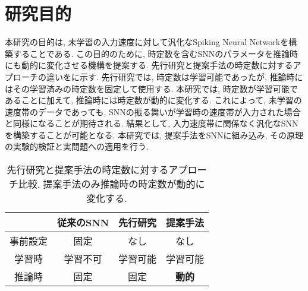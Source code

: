 \section{研究目的}
本研究の目的は, 未学習の入力速度に対して汎化なSpiking Neural Networkを構築することである.
この目的のために, 時定数を含むSNNのパラメータを推論時にも動的に変化させる機構を提案する.
先行研究と提案手法の時定数に対するアプローチの違いをに示す.
先行研究では, 時定数は学習可能であったが, 推論時にはその学習済みの時定数を固定して使用する.
本研究では, 時定数が学習可能であることに加えて, 推論時には時定数が動的に変化する.
これによって, 未学習の速度帯のデータであっても, SNNの振る舞いが学習時の速度帯が入力された場合と同様になることが期待される.
結果として, 入力速度帯に関係なく汎化なSNNを構築することが可能となる.
本研究では, 提案手法をSNNに組み込み, その原理の実験的検証と実問題への適用を行う.
\begin{table}[htbp]
    \centering
    \caption[先行研究と提案手法の時定数に対するアプローチ比較]{
        先行研究と提案手法の時定数に対するアプローチ比較. 提案手法のみ推論時の時定数が動的に変化する.
    }
    \label{tab:method:comparison}
    \begin{tabular}{cccc}
        \hline
         & \textbf{従来のSNN} & \textbf{先行研究}\cite{dhsnn,paramsnn} & \textbf{提案手法}\\
        \hline
        事前設定 & 固定 & なし & なし\\
        学習時 & 学習不可 & 学習可能 & 学習可能\\
        推論時 & 固定 & 固定 & \textbf{動的}\\
        \hline
    \end{tabular}
\end{table}
